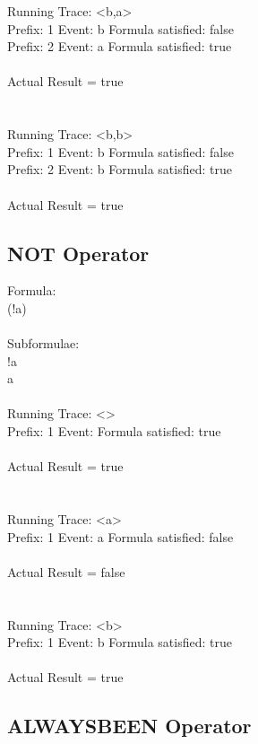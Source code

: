 \newpage

\noindent Running Trace: \textless b,a\textgreater\\
  Prefix: 1 Event: b Formula satisfied: false\\
  Prefix: 2 Event: a Formula satisfied: true\\
\\
Actual Result = true\\
\\
\\
Running Trace: \textless b,b\textgreater\\
  Prefix: 1 Event: b Formula satisfied: false\\
  Prefix: 2 Event: b Formula satisfied: true\\
\\
Actual Result = true\\

\subsection{NOT Operator}

Formula:\\
(!a)\\
\\
Subformulae:\\
!a\\
a\\
\\
Running Trace: \textless \textgreater\\
  Prefix: 1 Event:  Formula satisfied: true\\
\\
Actual Result = true\\
\\
\\
Running Trace: \textless a\textgreater\\
  Prefix: 1 Event: a Formula satisfied: false\\
\\
Actual Result = false\\
\\
\\
Running Trace: \textless b\textgreater\\
  Prefix: 1 Event: b Formula satisfied: true\\
\\
Actual Result = true\\

\subsection{ALWAYSBEEN Operator}

